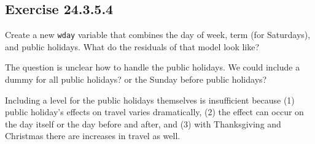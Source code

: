 \documentclass[]{book}
\newenvironment{Shaded}{\begin{snugshade}}{\end{snugshade}}
\newcommand{\CommentTok}[1]{\textcolor[rgb]{0.56,0.35,0.01}{\textit{#1}}}
\newcommand{\KeywordTok}[1]{\textcolor[rgb]{0.13,0.29,0.53}{\textbf{#1}}}
\newcommand{\NormalTok}[1]{#1}
\newcommand{\OperatorTok}[1]{\textcolor[rgb]{0.81,0.36,0.00}{\textbf{#1}}}
\newcommand{\StringTok}[1]{\textcolor[rgb]{0.31,0.60,0.02}{#1}}
\theoremstyle{plain}
\theoremstyle{remark}
\begin{document}
\begin{Shaded}
\end{Shaded}

\hypertarget{exercise-24.3.5.4}{%
\subsection*{\texorpdfstring{Exercise
{24.3.5.4}}{Exercise 24.3.5.4}}\label{exercise-24.3.5.4}}

Create a new \texttt{wday} variable that combines the day of week, term
(for Saturdays), and public holidays. What do the residuals of that
model look like?

The question is unclear how to handle the public holidays. We could
include a dummy for all public holidays? or the Sunday before public
holidays?

Including a level for the public holidays themselves is insufficient
because (1) public holiday's effects on travel varies dramatically, (2)
the effect can occur on the day itself or the day before and after, and
(3) with Thanksgiving and Christmas there are increases in travel as
well.
\end{document}
